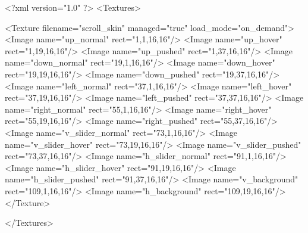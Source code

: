 <?xml version="1.0" ?>
<Textures>

	<Texture filename="scroll_skin" managed="true" load_mode="on_demand">
		<Image name="up_normal" rect="1,1,16,16"/>
		<Image name="up_hover" rect="1,19,16,16"/>
		<Image name="up_pushed" rect="1,37,16,16"/>
		<Image name="down_normal" rect="19,1,16,16"/>
		<Image name="down_hover" rect="19,19,16,16"/>
		<Image name="down_pushed" rect="19,37,16,16"/>
		<Image name="left_normal" rect="37,1,16,16"/>
		<Image name="left_hover" rect="37,19,16,16"/>
		<Image name="left_pushed" rect="37,37,16,16"/>
		<Image name="right_normal" rect="55,1,16,16"/>
		<Image name="right_hover" rect="55,19,16,16"/>
		<Image name="right_pushed" rect="55,37,16,16"/>
		<Image name="v_slider_normal" rect="73,1,16,16"/>
		<Image name="v_slider_hover" rect="73,19,16,16"/>
		<Image name="v_slider_pushed" rect="73,37,16,16"/>
		<Image name="h_slider_normal" rect="91,1,16,16"/>
		<Image name="h_slider_hover" rect="91,19,16,16"/>
		<Image name="h_slider_pushed" rect="91,37,16,16"/>
		<Image name="v_background" rect="109,1,16,16"/>
		<Image name="h_background" rect="109,19,16,16"/>
	</Texture>
	
</Textures>
